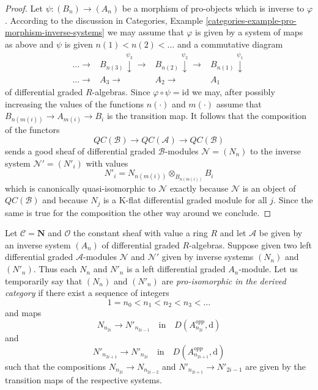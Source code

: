 \begin{proof}
Let $\psi : (B_n) \to (A_n)$ be a morphism of pro-objects which
is inverse to $\varphi$. According to the discussion in
Categories, Example
\ref{categories-example-pro-morphism-inverse-systems}
we may assume that $\varphi$ is given by a system of maps
as above and $\psi$ is given $n(1) < n(2) < \ldots$ and
a commutative diagram
$$
\begin{array}{cccc}\ldots \longrightarrow & B_{n(3)} \overset{\psi_3}{\downarrow}\longrightarrow & B_{n(2)} \overset{\psi_2}{\downarrow}\longrightarrow & B_{n(1)} \overset{\psi_1}{\downarrow} \\ \ldots \longrightarrow & A_3 \longrightarrow & A_2 \longrightarrow & A_1\end{array}
$$
of differential graded $R$-algebras. Since
$\varphi \circ \psi = \text{id}$ we may, after possibly
increasing the values of the functions $n(\cdot)$ and
$m(\cdot)$ assume that $B_{n(m(i))} \to A_{m(i)} \to B_i$
is the transition map. It follows that the composition of the
functors
$$
\mathit{QC}(\mathcal{B}) \to
\mathit{QC}(\mathcal{A}) \to
\mathit{QC}(\mathcal{B})
$$
sends a good sheaf of
differential graded $\mathcal{B}$-modules $\mathcal{N} = (N_n)$
to the inverse system $\mathcal{N}' = (N'_i)$ with values
$$
N'_i = N_{n(m(i))} \otimes_{B_{n(m(i))}} B_i
$$
which is canonically quasi-isomorphic to $\mathcal{N}$
exactly because $\mathcal{N}$ is an object of
$\mathit{QC}(\mathcal{B})$
and because $N_j$ is a K-flat differential graded
module for all $j$. Since the same is true for the
composition the other way around we conclude.
\end{proof}

Let $\mathcal{C} = \mathbf{N}$ and $\mathcal{O}$ the constant sheaf
with value a ring $R$ and let $\mathcal{A}$ be given by an inverse
system $(A_n)$ of differential graded $R$-algebras. Suppose given two
left differential graded $\mathcal{A}$-modules $\mathcal{N}$ and
$\mathcal{N}'$ given by inverse systems $(N_n)$ and $(N'_n)$.
Thus each $N_n$ and $N'_n$ is a left differential graded $A_n$-module.
Let us temporarily say that $(N_n)$ and $(N'_n)$ are
{\it pro-isomorphic in the derived category}
if there exist a sequence of integers
$$
1 = n_0 < n_1 < n_2 < n_3 < \ldots
$$
and maps
$$
N_{n_{2i}} \to N'_{n_{2i - 1}}
\quad\text{in}\quad
D(A_{n_{2i}}^{opp}, \text{d})
$$
and
$$
N'_{n_{2i + 1}} \to N'_{n_{2i}}
\quad\text{in}\quad
D(A_{n_{2i + 1}}^{opp}, \text{d})
$$
such that the compositions $N_{n_{2i}} \to N_{n_{2i - 2}}$
and $N'_{n_{2i + 1}} \to N'_{2i - 1}$ are given by the transition
maps of the respective systems.


